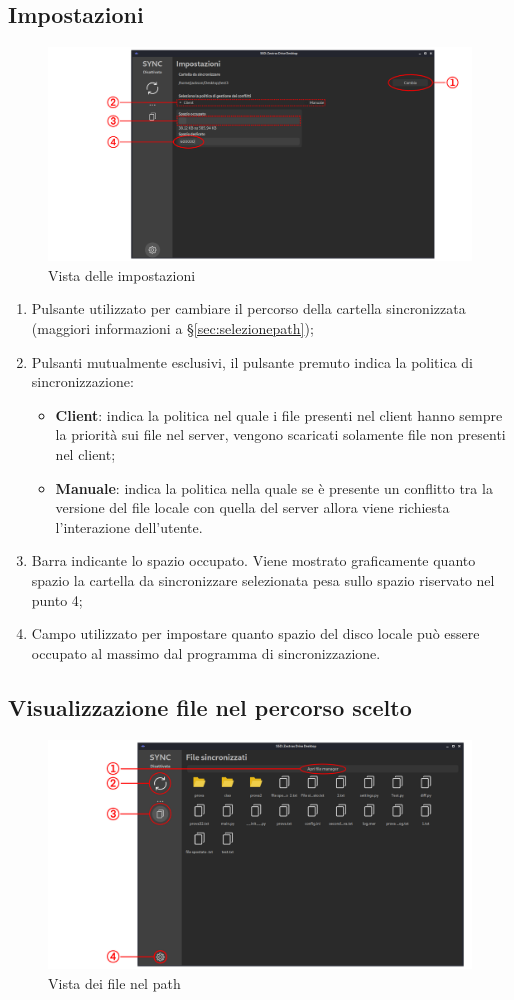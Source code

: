\subsection{Impostazioni}
\begin{figure}[H]
    \centering
    \includegraphics[scale = 0.15]{components/img/settings.png}
    \caption{Vista delle impostazioni}
    \label{fig:Vista delle impostazioni}
\end{figure}
\begin{enumerate}
	\item Pulsante utilizzato per cambiare il percorso della cartella sincronizzata (maggiori informazioni a \S{}\ref{sec:selezionepath});
	\item Pulsanti mutualmente esclusivi, il pulsante premuto indica la politica di sincronizzazione:
	\begin{itemize}
		\item \textbf{Client}: indica la politica nel quale i file presenti nel client hanno sempre la priorità sui file nel server, vengono scaricati solamente file non presenti nel client;
		\item \textbf{Manuale}: indica la politica nella quale se è presente un conflitto tra la versione del file locale con quella del server allora viene richiesta l'interazione dell'utente.
	\end{itemize}
	\item Barra indicante lo spazio occupato. Viene mostrato graficamente quanto spazio la cartella da sincronizzare selezionata pesa sullo spazio riservato nel punto 4;
	\item Campo utilizzato per impostare quanto spazio del disco locale può essere occupato al massimo dal programma di sincronizzazione.
\end{enumerate}
\subsection{Visualizzazione file nel percorso scelto}
\begin{figure}[H]
    \centering
    \includegraphics[scale = 0.30]{components/img/file-view.png}
    \caption{Vista dei file nel path}
    \label{fig:Vista dei file nel percorso scelto}
\end{figure}